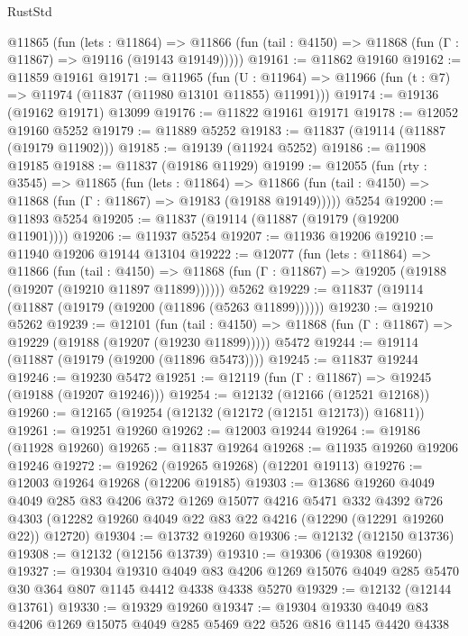 \begin{lexlean}{RustStd}
\begin{coremodule}
    @11865
      (fun (lets : @11864) =>
      @11866 (fun (tail : @4150) => @11868 (fun (Γ : @11867) => @19116 (@19143 @19149)))))
@19161 := @11862 @19160
@19162 := @11859 @19161
@19171 := @11965
    (fun (U : @11964) => @11966 (fun (t : @7) => @11974 (@11837 (@11980 @13101 @11855) @11991)))
@19174 := @19136 (@19162 @19171) @13099
@19176 := @11822 @19161 @19171
@19178 := @12052 @19160 @5252
@19179 := @11889 @5252
@19183 := @11837 (@19114 (@11887 (@19179 @11902)))
@19185 := @19139 (@11924 @5252)
@19186 := @11908 @19185
@19188 := @11837 (@19186 @11929)
@19199 := @12055
    (fun (rty : @3545) =>
    @11865
      (fun (lets : @11864) =>
      @11866 (fun (tail : @4150) => @11868 (fun (Γ : @11867) => @19183 (@19188 @19149)))))
    @5254
@19200 := @11893 @5254
@19205 := @11837 (@19114 (@11887 (@19179 (@19200 @11901))))
@19206 := @11937 @5254
@19207 := @11936 @19206
@19210 := @11940 @19206 @19144 @13104
@19222 := @12077
    (fun (lets : @11864) =>
    @11866
      (fun (tail : @4150) =>
      @11868 (fun (Γ : @11867) => @19205 (@19188 (@19207 (@19210 @11897 @11899))))))
    @5262
@19229 := @11837 (@19114 (@11887 (@19179 (@19200 (@11896 (@5263 @11899))))))
@19230 := @19210 @5262
@19239 := @12101
    (fun (tail : @4150) => @11868 (fun (Γ : @11867) => @19229 (@19188 (@19207 (@19230 @11899)))))
    @5472
@19244 := @19114 (@11887 (@19179 (@19200 (@11896 @5473))))
@19245 := @11837 @19244
@19246 := @19230 @5472
@19251 := @12119 (fun (Γ : @11867) => @19245 (@19188 (@19207 @19246)))
@19254 := @12132 (@12166 (@12521 @12168))
@19260 := @12165 (@19254 (@12132 (@12172 (@12151 @12173)) @16811))
@19261 := @19251 @19260
@19262 := @12003 @19244
@19264 := @19186 (@11928 @19260)
@19265 := @11837 @19264
@19268 := @11935 @19260 @19206 @19246
@19272 := @19262 (@19265 @19268) (@12201 @19113)
@19276 := @12003 @19264 @19268 (@12206 @19185)
@19303 := @13686
    @19260
    @4049
    @4049
    @285
    @83
    @4206
    @372
    @1269
    @15077
    @4216
    @5471
    @332
    @4392
    @726
    @4303
    (@12282 @19260 @4049 @22 @83 @22 @4216 (@12290 (@12291 @19260 @22)) @12720)
@19304 := @13732 @19260
@19306 := @12132 (@12150 @13736)
@19308 := @12132 (@12156 @13739)
@19310 := @19306 (@19308 @19260)
@19327 := @19304
    @19310
    @4049
    @83
    @4206
    @1269
    @15076
    @4049
    @285
    @5470
    @30
    @364
    @807
    @1145
    @4412
    @4338
    @4338
    @5270
@19329 := @12132 (@12144 @13761)
@19330 := @19329 @19260
@19347 := @19304
    @19330
    @4049
    @83
    @4206
    @1269
    @15075
    @4049
    @285
    @5469
    @22
    @526
    @816
    @1145
    @4420
    @4338

\end{coremodule}
\end{lexlean}
